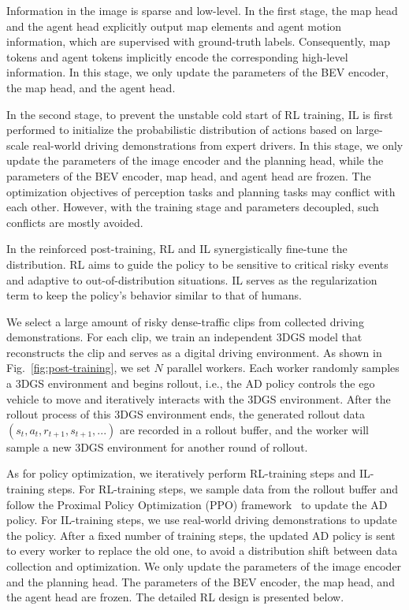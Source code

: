 Information in the image is sparse and low-level. In the first stage,  
the map head and the agent head explicitly output map elements and agent motion information, which are supervised with ground-truth labels. Consequently,  
map tokens and agent tokens implicitly encode the corresponding high-level information.  
In this stage, we only update the parameters of the BEV encoder, the map head, and the agent head.



In the second stage, to prevent the unstable cold start of RL training, IL is first performed to initialize the probabilistic distribution of actions based on large-scale real-world driving demonstrations from expert drivers. In this stage, we only update the parameters of the image encoder and the planning head, while the parameters of the BEV encoder, map head, and agent head are frozen. The optimization objectives of perception tasks and planning tasks may conflict with each other. However, with the training stage and parameters decoupled, such conflicts are mostly avoided.

In the reinforced post-training, RL and IL synergistically fine-tune the distribution. RL aims to guide the policy to be sensitive to critical risky events and adaptive to out-of-distribution situations. IL serves as the regularization term to keep the policy's behavior similar to that of humans.

We select a large amount of risky dense-traffic clips from collected driving demonstrations. For each clip, we train an independent 3DGS model that reconstructs the clip and serves as a digital driving environment.  
As shown in Fig.~\ref{fig:post-training}, we set $N$ parallel workers.  
Each worker randomly samples a 3DGS environment and begins rollout, i.e., the AD policy controls the ego vehicle to move and iteratively interacts with the 3DGS environment. After the rollout process of this 3DGS environment ends, the generated rollout data $(s_t,a_t, r_{t+1},s_{t+1},...)$ are recorded in a rollout buffer, and the worker will sample a new 3DGS environment for another round of rollout.

As for policy optimization, we iteratively perform RL-training steps and IL-training steps. For RL-training steps, we sample data from the rollout buffer and follow the Proximal Policy Optimization (PPO) framework~\cite{PPO} to update the AD policy. For IL-training steps, we use real-world driving demonstrations to update the policy. After a fixed number of training steps, the updated AD policy is sent to every worker to replace the old one, to avoid a distribution shift between data collection and optimization.
We only update the parameters of the image encoder and the planning head. The parameters of the BEV encoder, the map head, and the agent head are frozen.  
The detailed RL design is presented below.

